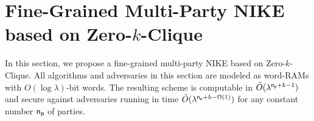 \section{Fine-Grained Multi-Party NIKE based on Zero-$k$-Clique}
\label{sec:time-nike}
	In this section, we propose a fine-grained multi-party NIKE based on Zero-$k$-Clique. All algorithms and adversaries in this section are modeled as word-RAMs with $O(\log\lambda)$-bit words. %
The resulting scheme is computable in $\tilde{O}(\lambda^{\mathsf{n_p}+k-1})$ and secure against adversaries running in time $\tilde{O}(\lambda^{\mathsf{n_p}+k-\Omega(1)})$ for any constant number $\mathsf{n_p}$ of parties.

